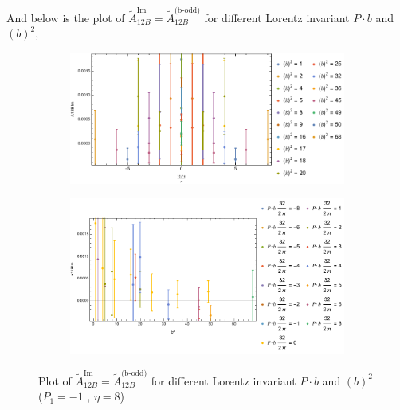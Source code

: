 \documentclass[]{article}
\numberwithin{equation}{section}
\newcommand{\tAmp}{\widetilde{A}}
\newcommand{\tAmp}{\ensuremath{\widetilde{A}^{(+)}}}
\begin{document}
And below is the plot of $\tAmp^{\text{Im}}_{12B}=\tAmp^{\text{(b-odd)}}_{12B}$ for different Lorentz invariant $P\cdot b$ and $(b)^2$,
\begin{figure}[h!]
     \centering
     \begin{subfigure}[b]{0.45\textwidth}
         \centering
         \includegraphics[width=\textwidth]{bP_A12B_b_odd_P1_-1_eta_8a.pdf}
     \end{subfigure}
     \begin{subfigure}[b]{0.45\textwidth}
         \centering
         \includegraphics[width=\textwidth]{bsq_A12B_b_odd_P1_-1_eta_8a.pdf}
     \end{subfigure}
        \caption{Plot of $\tAmp^{\text{Im}}_{12B}=\tAmp^{\text{(b-odd)}}_{12B}$ for different Lorentz invariant $P\cdot b$ and $(b)^2$  ($P_{1} = -1$ , $\eta=8$)}
\end{figure}
\end{document}
